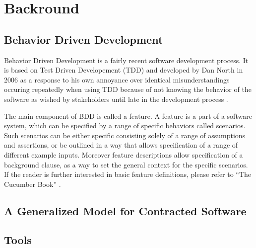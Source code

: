 \section{Backround}

\subsection{Behavior Driven Development}
\label{sub:bdd}
Behavior Driven Development is a fairly recent software development process. It is based on Test Driven Developement (TDD) and developed by Dan North in 2006 as a response to his own annoyance over identical misunderstandings occuring repeatedly when using TDD because of not knowing the behavior of the software as wished by stakeholders until late in the development process \cite{north2006}. 

The main component of BDD is called a feature. 
A feature is a part of a software system,
which can be specified by a range of specific behaviors called scenarios.
Such scenarios can be either specific consisting solely of a range of
assumptions and assertions, or be outlined in a way that allows
specification of a range of different example inputs.
Moreover feature descriptions allow specification of a background clause,
as a way to set the general context for the specific scenarios.
If the reader is further interested in basic feature definitions,
please refer to “The Cucumber Book” \cite{hellesoy2012}.

\subsection{A Generalized Model for Contracted Software}
\label{sub:AGeneralizedModelforContractedSoftware}


\subsection{Tools}
